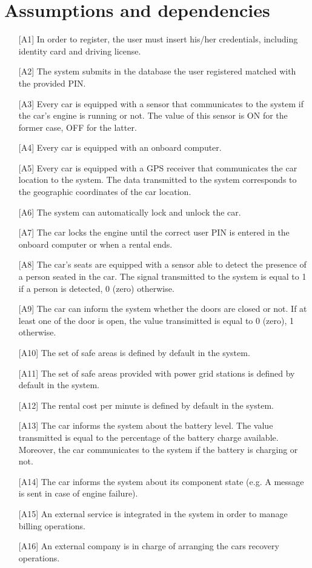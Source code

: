 \section{Assumptions and dependencies}

\begin{itemize}
	\item[{[A1]}] In order to register, the user must insert his/her credentials, including identity card and driving license.
	\item[{[A2]}] The system submits in the database the user registered matched with the provided PIN.
	\item[{[A3]}] Every car is equipped with a sensor that communicates to the system if the car's engine is running or not. The value of this sensor is ON for the former case, OFF for the latter.
	\item[{[A4]}] Every car is equipped with an onboard computer.
	\item[{[A5]}] Every car is equipped with a GPS receiver that communicates the car location to the system. The data transmitted to the system corresponds to the geographic coordinates of the car location.
	\item[{[A6]}] The system can automatically lock and unlock the car.
	\item[{[A7]}] The car locks the engine until the correct user PIN is entered in the onboard computer or when a rental ends.
	\item[{[A8]}] The car's seats are equipped with a sensor able to detect the presence of a person seated in the car. The signal transmitted to the system is equal to 1 if a person is detected, 0 (zero) otherwise.
	\item[{[A9]}] The car can inform the system whether the doors are closed or not. If at least one of the door is open, the value transimitted is equal to 0 (zero), 1 otherwise.
	\item[{[A10]}] The set of safe areas is defined by default in the system.
	\item[{[A11]}] The set of safe areas provided with power grid stations is defined by default in the system.
	\item[{[A12]}] The rental cost per minute is defined by default in the system.
	\item[{[A13]}] The car informs the system about the battery level. The value transmitted is equal to the percentage of the battery charge available. Moreover, the car communicates to the system if the battery is charging or not.
	\item[{[A14]}] The car informs the system about its component state (e.g. A message is sent in case of engine failure).
	\item[{[A15]}] An external service is integrated in the system in order to manage billing operations.
	\item[{[A16]}] An external company is in charge of arranging the cars recovery operations.
\end{itemize}
